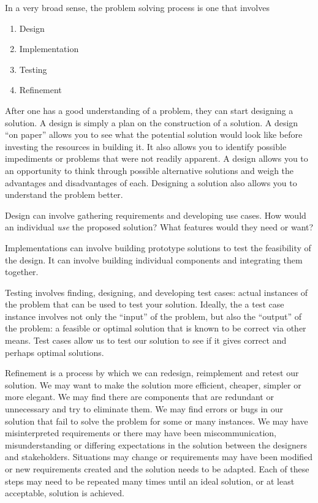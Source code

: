 In a very broad sense, the problem solving process is one that involves
\begin{enumerate}
  \item Design
  \item Implementation
  \item Testing
  \item Refinement
\end{enumerate}

After one has a good understanding of a problem, they can start designing
a solution.  A design is simply a plan on the construction of a solution.  A
design ``on paper'' allows you to see what the potential solution would look
like before investing the resources in building it.  It also allows you to identify
possible impediments or problems that were not readily apparent.  A
design allows you to an opportunity to think through possible alternative
solutions and weigh the advantages and disadvantages of each.  
Designing a solution also allows you to understand the problem better.

Design can involve gathering requirements and developing use cases.  
How would an individual \emph{use} the proposed solution?  What features
would they need or want?  

Implementations can involve building prototype solutions to test the
feasibility of the design.  It can involve building individual components and
integrating them together.

Testing involves finding, designing, and developing test cases: actual
instances of the problem that can be used to test your solution.  Ideally, the
a test case instance involves not only the ``input'' of the problem, but also
the ``output'' of the problem: a feasible or optimal solution that is known
to be correct via other means.  Test cases allow us to test our solution to
see if it gives correct and perhaps optimal solutions.  

Refinement is a process by which we can redesign, reimplement and
retest our solution.  We may want to make the solution more efficient, 
cheaper, simpler or more elegant.  We may find there are components
that are redundant or unnecessary and try to eliminate them.  We
may find errors or bugs in our solution that fail to solve the problem 
for some or many instances.  We may have misinterpreted requirements
or there may have been miscommunication, misunderstanding or
differing expectations in the solution between the designers and 
stakeholders.  Situations may change or requirements may have
been modified or new requirements created and the solution needs
to be adapted.  Each of these steps may need to be repeated many
times until an ideal solution, or at least acceptable, solution is achieved.

